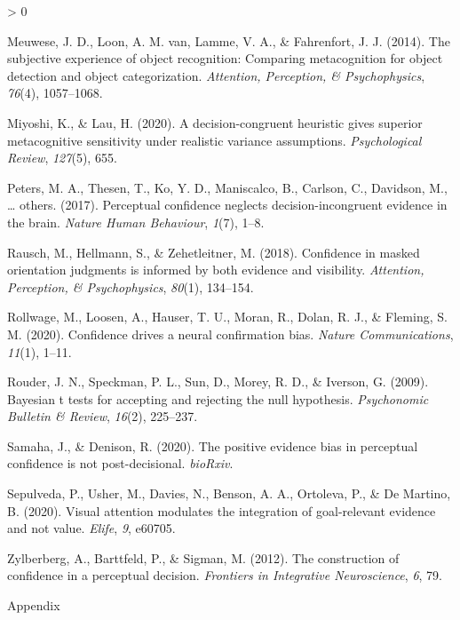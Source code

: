 \documentclass[
  english,
  man]{apa6}
\newlength{\cslhangindent}
\newenvironment{CSLReferences}[2] %
 {%
  \setlength{\parindent}{0pt}
  \ifodd #1 \everypar{\setlength{\hangindent}{\cslhangindent}}\ignorespaces\fi
  \ifnum #2 > 0
  \setlength{\parskip}{#2\baselineskip}
  \fi
 }%
 {}
\begin{document}
\begin{CSLReferences}{1}{0}
\leavevmode\hypertarget{ref-meuwese2014subjective}{}%
Meuwese, J. D., Loon, A. M. van, Lamme, V. A., \& Fahrenfort, J. J. (2014). The subjective experience of object recognition: Comparing metacognition for object detection and object categorization. \emph{Attention, Perception, \& Psychophysics}, \emph{76}(4), 1057--1068.

\leavevmode\hypertarget{ref-miyoshi2020decision}{}%
Miyoshi, K., \& Lau, H. (2020). A decision-congruent heuristic gives superior metacognitive sensitivity under realistic variance assumptions. \emph{Psychological Review}, \emph{127}(5), 655.

\leavevmode\hypertarget{ref-peters2017perceptual}{}%
Peters, M. A., Thesen, T., Ko, Y. D., Maniscalco, B., Carlson, C., Davidson, M., \ldots{} others. (2017). Perceptual confidence neglects decision-incongruent evidence in the brain. \emph{Nature Human Behaviour}, \emph{1}(7), 1--8.

\leavevmode\hypertarget{ref-rausch2018confidence}{}%
Rausch, M., Hellmann, S., \& Zehetleitner, M. (2018). Confidence in masked orientation judgments is informed by both evidence and visibility. \emph{Attention, Perception, \& Psychophysics}, \emph{80}(1), 134--154.

\leavevmode\hypertarget{ref-rollwage2020confidence}{}%
Rollwage, M., Loosen, A., Hauser, T. U., Moran, R., Dolan, R. J., \& Fleming, S. M. (2020). Confidence drives a neural confirmation bias. \emph{Nature Communications}, \emph{11}(1), 1--11.

\leavevmode\hypertarget{ref-rouder2009bayesian}{}%
Rouder, J. N., Speckman, P. L., Sun, D., Morey, R. D., \& Iverson, G. (2009). Bayesian t tests for accepting and rejecting the null hypothesis. \emph{Psychonomic Bulletin \& Review}, \emph{16}(2), 225--237.

\leavevmode\hypertarget{ref-samaha2020positive}{}%
Samaha, J., \& Denison, R. (2020). The positive evidence bias in perceptual confidence is not post-decisional. \emph{bioRxiv}.

\leavevmode\hypertarget{ref-sepulveda2020visual}{}%
Sepulveda, P., Usher, M., Davies, N., Benson, A. A., Ortoleva, P., \& De Martino, B. (2020). Visual attention modulates the integration of goal-relevant evidence and not value. \emph{Elife}, \emph{9}, e60705.

\leavevmode\hypertarget{ref-zylberberg2012construction}{}%
Zylberberg, A., Barttfeld, P., \& Sigman, M. (2012). The construction of confidence in a perceptual decision. \emph{Frontiers in Integrative Neuroscience}, \emph{6}, 79.

\end{CSLReferences}

\endgroup

Appendix
\end{document}
